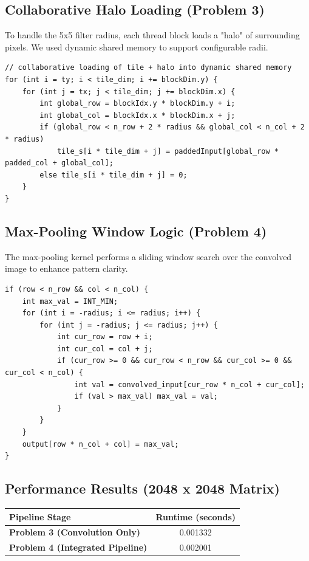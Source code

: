 \documentclass[11pt]{article}
\begin{document}
\subsection*{Collaborative Halo Loading (Problem 3)}
To handle the 5x5 filter radius, each thread block loads a "halo" of surrounding pixels. We used dynamic shared memory to support configurable radii.

\begin{lstlisting}
// collaborative loading of tile + halo into dynamic shared memory
for (int i = ty; i < tile_dim; i += blockDim.y) {
    for (int j = tx; j < tile_dim; j += blockDim.x) {
        int global_row = blockIdx.y * blockDim.y + i;
        int global_col = blockIdx.x * blockDim.x + j;
        if (global_row < n_row + 2 * radius && global_col < n_col + 2 * radius)
            tile_s[i * tile_dim + j] = paddedInput[global_row * padded_col + global_col];
        else tile_s[i * tile_dim + j] = 0;
    }
}
\end{lstlisting}

\subsection*{Max-Pooling Window Logic (Problem 4)}
The max-pooling kernel performs a sliding window search over the convolved image to enhance pattern clarity.

\begin{lstlisting}
if (row < n_row && col < n_col) {
    int max_val = INT_MIN;
    for (int i = -radius; i <= radius; i++) {
        for (int j = -radius; j <= radius; j++) {
            int cur_row = row + i;
            int cur_col = col + j;
            if (cur_row >= 0 && cur_row < n_row && cur_col >= 0 && cur_col < n_col) {
                int val = convolved_input[cur_row * n_col + cur_col];
                if (val > max_val) max_val = val;
            }
        }
    }
    output[row * n_col + col] = max_val;
}
\end{lstlisting}

\subsection*{Performance Results (2048 x 2048 Matrix)}
\begin{center}
\begin{tabular}{@{}lc@{}}
\toprule
Pipeline Stage & Runtime (seconds) \\
\midrule
\textbf{Problem 3 (Convolution Only)} & 0.001332 \\
\textbf{Problem 4 (Integrated Pipeline)} & 0.002001 \\
\bottomrule
\end{tabular}
\end{center}
\end{document}
